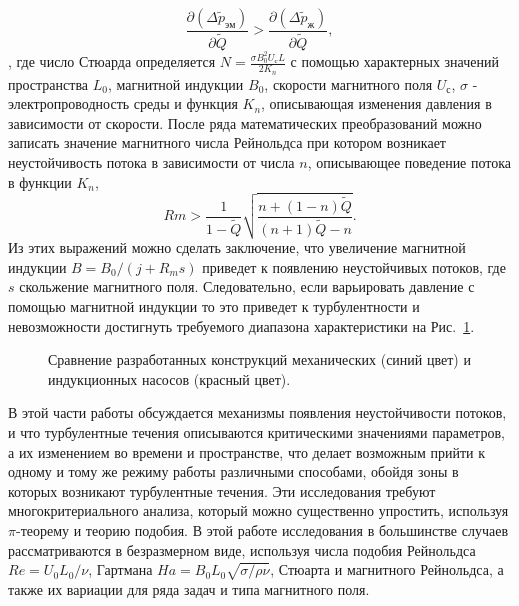 \begin{equation*}
    \frac{\partial (\Delta \widetilde{p}_{эм})} {\partial \widetilde{Q}} > \frac{\partial (\Delta \widetilde{p}_{ж})} {\partial \widetilde{Q}},
\end{equation*}, 
где число Стюарда определяется $N = \frac{\sigma B_{0}^2 U_{с} L}{2K_{n}}$ с помощью характерных значений пространства $L_0$, магнитной индукции $B_{0}$, скорости магнитного поля $U_{с}$, $\sigma$ - электропроводность среды и функция $K_{n}$, описывающая изменения давления в зависимости от скорости. После ряда математических преобразований можно записать значение магнитного числа Рейнольдса при котором возникает неустойчивость потока в зависимости от числа $n$, описывающее поведение потока в функции $K_{n}$, 
\begin{equation*}
    Rm > \frac{1}{1-\widetilde{Q}} \sqrt{\frac{n+(1-n) \widetilde{Q}}{(n+1)\widetilde{Q}-n}}.
\end{equation*}
Из этих выражений можно сделать заключение, что увеличение магнитной индукции $B = B_{0} / (j + R_{m}s)$ приведет к появлению неустойчивых потоков, где $s$ скольжение магнитного поля. Следовательно, если варьировать давление с помощью магнитной индукции то это приведет к турбулентности и невозможности достигнуть требуемого диапазона характеристики на Рис.~\ref{fig:intreting_pq}. 

\begin{figure}[h]
	\caption{Сравнение разработанных конструкций механических (синий цвет) и индукционных насосов (красный цвет).}
	\label{fig:intreting_pq}
\end{figure}

В этой части работы обсуждается механизмы появления неустойчивости потоков, и что турбулентные течения описываются критическими значениями параметров, а их изменением во времени и пространстве, что делает возможным прийти к одному и тому же режиму работы различными способами, обойдя зоны в которых возникают турбулентные течения. Эти исследования требуют многокритериального анализа, который можно существенно упростить, используя $\pi$-теорему и теорию подобия. В этой работе исследования в большинстве случаев рассматриваются в безразмерном виде, используя числа подобия Рейнольдса $Re= U_{0} L_{0}/ \nu$, Гартмана $Ha = B_{0} L_{0} \sqrt{\sigma/ \rho \nu}$, Стюарта и магнитного Рейнольдса, а также их вариации для ряда задач и типа магнитного поля. 


